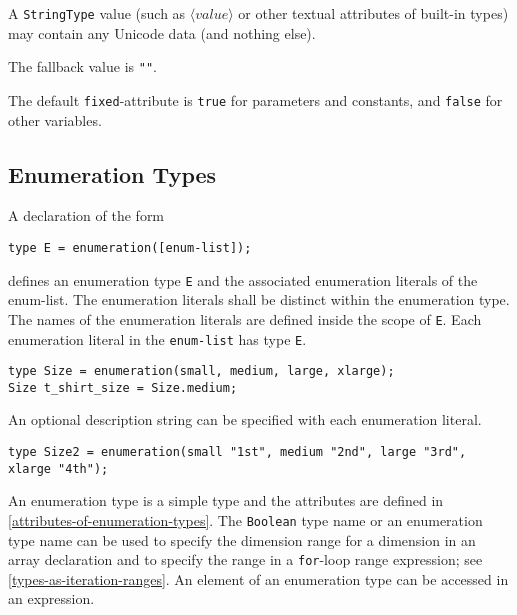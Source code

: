 A \lstinline!StringType! value (such as $\langle\mathit{value}\rangle$ or other textual attributes of built-in types) may contain any Unicode data (and nothing else).

The fallback value is \lstinline!""!.

The default \lstinline!fixed!-attribute is \lstinline!true! for parameters and constants, and \lstinline!false! for other variables.

\subsection{Enumeration Types}\label{enumeration-types}

A declaration of the form
\begin{lstlisting}[language=modelica]
type E = enumeration([enum-list]);
\end{lstlisting}%
defines an enumeration type \lstinline!E! and the associated enumeration literals of the enum-list.
The enumeration literals shall be distinct within the enumeration type.
The names of the enumeration literals are defined inside the scope of \lstinline!E!.
Each enumeration literal in the \lstinline!enum-list! has type \lstinline!E!.

\begin{example}
\begin{lstlisting}[language=modelica]
type Size = enumeration(small, medium, large, xlarge);
Size t_shirt_size = Size.medium;
\end{lstlisting}
\end{example}

An optional description string can be specified with each enumeration literal.

\begin{example}
\begin{lstlisting}[language=modelica]
type Size2 = enumeration(small "1st", medium "2nd", large "3rd", xlarge "4th");
\end{lstlisting}
\end{example}

An enumeration type is a simple type and the attributes are defined in \cref{attributes-of-enumeration-types}.
The \lstinline!Boolean! type name or an enumeration type name can be used to specify the dimension range for a dimension in an array declaration and to specify the range in a \lstinline!for!-loop range expression; see \cref{types-as-iteration-ranges}.
An element of an enumeration type can be accessed in an expression.

